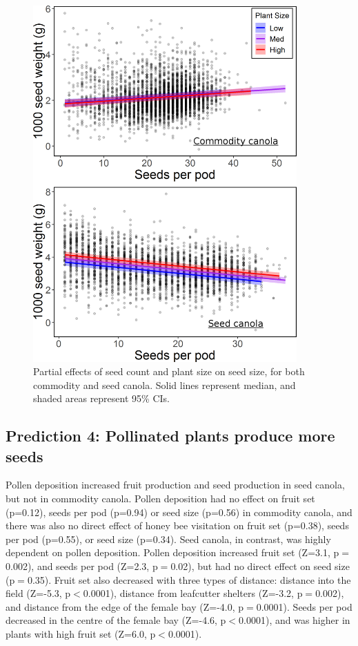 \documentclass[12pt]{article} %
\begin{document}
\begin{figure}
    \centering
    \includegraphics[width=0.9\textwidth,keepaspectratio=true]{seedWeightSeedCount_both.png}
    \caption[Partial effects of seed count and plant size on seed size]{Partial effects of seed count and plant size on seed size, for both commodity and seed canola. Solid lines represent median, and shaded areas represent 95\% CIs.}
    \label{fig:seedWeightCount_both}
\end{figure}

\subsection{Prediction 4: Pollinated plants produce more seeds}

Pollen deposition increased fruit production and seed production in seed canola, but not in commodity canola.
Pollen deposition had no effect on fruit set (p=0.12), seeds per pod (p=0.94) or seed size (p=0.56) in commodity canola, and there was also no direct effect of honey bee visitation on fruit set (p=0.38), seeds per pod (p=0.55), or seed size (p=0.34).
Seed canola, in contrast, was highly dependent on pollen deposition.
Pollen deposition increased fruit set (Z=3.1, p$=$0.002), and seeds per pod (Z=2.3, p$=$0.02), but had no direct effect on seed size (p$=$0.35).
Fruit set also decreased with three types of distance: distance into the field (Z=-5.3, p$<$0.0001), distance from leafcutter shelters (Z=-3.2, p$=$0.002), and distance from the edge of the female bay (Z=-4.0, p$=$0.0001).
Seeds per pod decreased in the centre of the female bay (Z=-4.6, p$<$0.0001), and was higher in plants with high fruit set (Z=6.0, p$<$0.0001).
\end{document}
